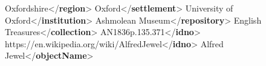 \begin{shaded}
\hspace*{1em}\hspace*{1em}Oxfordshire{</\textbf{region}>}\mbox{}\newline 
\hspace*{1em}\hspace*{1em}Oxford{</\textbf{settlement}>}\mbox{}\newline 
\hspace*{1em}\hspace*{1em}University of Oxford{</\textbf{institution}>}\mbox{}\newline 
\hspace*{1em}\hspace*{1em}Ashmolean Museum{</\textbf{repository}>}\mbox{}\newline 
\hspace*{1em}\hspace*{1em}English Treasures{</\textbf{collection}>}\mbox{}\newline 
\hspace*{1em}\hspace*{1em}AN1836p.135.371{</\textbf{idno}>}\mbox{}\newline 
\hspace*{1em}\hspace*{1em}https://en.wikipedia.org/wiki/Alfred\textunderscore Jewel{</\textbf{idno}>}\mbox{}\newline 
\hspace*{1em}\hspace*{1em}Alfred Jewel{</\textbf{objectName}>}\mbox{}\newline 
\hspace*{1em}\mbox{}\newline 
\hspace*{1em}\mbox{}\newline 

\end{shaded}
